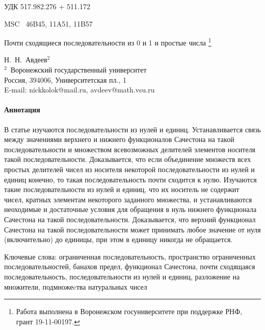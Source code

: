 \documentclass[a4paper,openbib]{article}
\theoremstyle{definition}
\begin{document}
УДК  { 517.982.276 %
     + 511.172    }%

MSC~
	46B45,
	11A51,
	11B57



\begin{center}
	Почти сходящиеся последовательности из 0 и 1 и простые числа
	\footnote{
		Работа выполнена в Воронежском госуниверситете при поддержке РНФ, грант 19-11-00197.
	}
\end{center}

\begin{center}
	{Н.~Н.~Авдеев$^{2}$\\[4pt]}
	{\rm\footnotesize{$^2$\,
	Воронежский государственный университет\\
	Россия, 394006, Университетская пл., 1\\
	E-mail: nickkolok@mail.ru, avdeev@math.vsu.ru}}
\end{center}



\paragraph{Аннотация}
В статье изучаются последовательности из нулей и единиц.
Устанавливается связь между значениями верхнего и нижнего функционалов Сачестона
на такой последовательности и множеством всевозможных делителей
элементов носителя такой последовательности.
Доказывается, что если объединение множеств всех простых делителей чисел из носителя некоторой последовательности
из нулей и единиц конечно, то такая последовательность почти сходится к нулю.
Изучаются такие последовательности из нулей и единиц,
что их носитель не содержит чисел,
кратных элементам некоторого заданного множества,
и устанавливаются неоходимые и достаточные условия для обращения в нуль нижнего функционала Сачестона
на такой последовательности.
Доказывается, что верхний функционал Сачестона на такой последовательности
может принимать любое значение от нуля (включительно) до единицы,
при этом в единицу никогда не обращается.



Ключевые слова:
	ограниченная последовательность,
	пространство ограниченных последовательностей,
	банахов предел,
	функционал Сачестона,
	почти сходящаяся последовательность,
	последовательности из нулей и единиц,
	разложение на множители,
	подмножеcтва натуральных чисел
\end{document}
